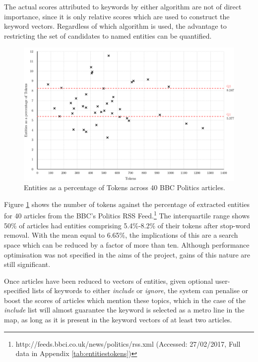 The actual scores attributed to keywords by either algorithm are not of direct importance, since it is only relative scores which are used to construct the keyword vectors. Regardless of which algorithm is used, the advantage to restricting the set of candidates to named entities can be quantified. 
\begin{figure}[htbp!]
	\centering
	\includegraphics[width=\textwidth]{img/implementation/TokensEntities.pdf}
	\caption{Entities as a percentage of Tokens across 40 BBC Politics articles.}
	\label{fig:tokensentities}
\end{figure}

Figure \ref{fig:tokensentities} shows the number of tokens against the percentage of extracted entities for 40 articles from the BBC's Politics RSS Feed.\footnote{http://feeds.bbci.co.uk/news/politics/rss.xml (Accessed: 27/02/2017, Full data in Appendix \ref{tab:entitiestokens})} The interquartile range shows 50\% of articles had entities comprising 5.4\%-8.2\% of their tokens after stop-word removal. With the mean equal to 6.65\%, the implications of this are a search space which can be reduced by a factor of more than ten. Although performance optimisation was not specified in the aims of the project, gains of this nature are still significant.

Once articles have been reduced to vectors of entities, given optional user-specified lists of keywords to either \textit{include} or \textit{ignore}, the system can penalise or boost the scores of articles which mention these topics, which in the case of the \textit{include} list will almost guarantee the keyword is selected as a metro line in the map, as long as it is present in the keyword vectors of at least two articles. 

